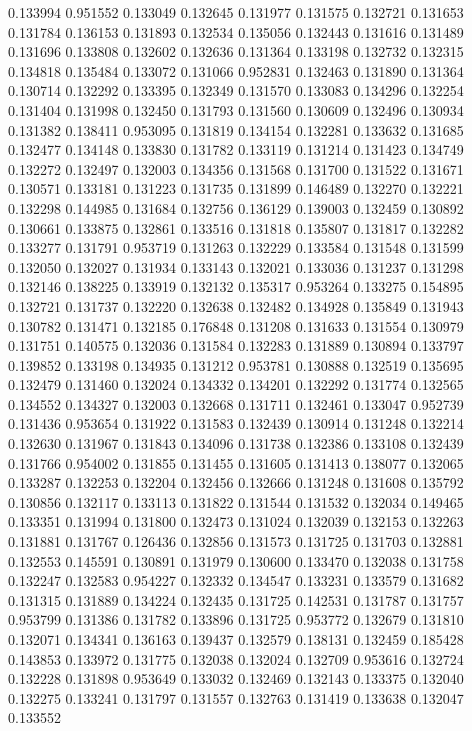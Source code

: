 0.133994
0.951552
0.133049
0.132645
0.131977
0.131575
0.132721
0.131653
0.131784
0.136153
0.131893
0.132534
0.135056
0.132443
0.131616
0.131489
0.131696
0.133808
0.132602
0.132636
0.131364
0.133198
0.132732
0.132315
0.134818
0.135484
0.133072
0.131066
0.952831
0.132463
0.131890
0.131364
0.130714
0.132292
0.133395
0.132349
0.131570
0.133083
0.134296
0.132254
0.131404
0.131998
0.132450
0.131793
0.131560
0.130609
0.132496
0.130934
0.131382
0.138411
0.953095
0.131819
0.134154
0.132281
0.133632
0.131685
0.132477
0.134148
0.133830
0.131782
0.133119
0.131214
0.131423
0.134749
0.132272
0.132497
0.132003
0.134356
0.131568
0.131700
0.131522
0.131671
0.130571
0.133181
0.131223
0.131735
0.131899
0.146489
0.132270
0.132221
0.132298
0.144985
0.131684
0.132756
0.136129
0.139003
0.132459
0.130892
0.130661
0.133875
0.132861
0.133516
0.131818
0.135807
0.131817
0.132282
0.133277
0.131791
0.953719
0.131263
0.132229
0.133584
0.131548
0.131599
0.132050
0.132027
0.131934
0.133143
0.132021
0.133036
0.131237
0.131298
0.132146
0.138225
0.133919
0.132132
0.135317
0.953264
0.133275
0.154895
0.132721
0.131737
0.132220
0.132638
0.132482
0.134928
0.135849
0.131943
0.130782
0.131471
0.132185
0.176848
0.131208
0.131633
0.131554
0.130979
0.131751
0.140575
0.132036
0.131584
0.132283
0.131889
0.130894
0.133797
0.139852
0.133198
0.134935
0.131212
0.953781
0.130888
0.132519
0.135695
0.132479
0.131460
0.132024
0.134332
0.134201
0.132292
0.131774
0.132565
0.134552
0.134327
0.132003
0.132668
0.131711
0.132461
0.133047
0.952739
0.131436
0.953654
0.131922
0.131583
0.132439
0.130914
0.131248
0.132214
0.132630
0.131967
0.131843
0.134096
0.131738
0.132386
0.133108
0.132439
0.131766
0.954002
0.131855
0.131455
0.131605
0.131413
0.138077
0.132065
0.133287
0.132253
0.132204
0.132456
0.132666
0.131248
0.131608
0.135792
0.130856
0.132117
0.133113
0.131822
0.131544
0.131532
0.132034
0.149465
0.133351
0.131994
0.131800
0.132473
0.131024
0.132039
0.132153
0.132263
0.131881
0.131767
0.126436
0.132856
0.131573
0.131725
0.131703
0.132881
0.132553
0.145591
0.130891
0.131979
0.130600
0.133470
0.132038
0.131758
0.132247
0.132583
0.954227
0.132332
0.134547
0.133231
0.133579
0.131682
0.131315
0.131889
0.134224
0.132435
0.131725
0.142531
0.131787
0.131757
0.953799
0.131386
0.131782
0.133896
0.131725
0.953772
0.132679
0.131810
0.132071
0.134341
0.136163
0.139437
0.132579
0.138131
0.132459
0.185428
0.143853
0.133972
0.131775
0.132038
0.132024
0.132709
0.953616
0.132724
0.132228
0.131898
0.953649
0.133032
0.132469
0.132143
0.133375
0.132040
0.132275
0.133241
0.131797
0.131557
0.132763
0.131419
0.133638
0.132047
0.133552
